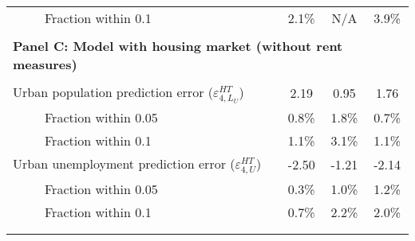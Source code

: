 \begin{tabular}{lrrr}
~~~~~Fraction within 0.1 & \multicolumn{1}{c}{2.1\%} & \multicolumn{1}{c}{N/A} & \multicolumn{1}{c}{3.9\%} \\
      &       &       &  \\
\multicolumn{4}{l}{\textbf{Panel C: Model with housing market (without rent measures)}} \\
      &       &       &  \\
Urban population prediction error ($\varepsilon_{4,L_{U}}^{HT}$) & \multicolumn{1}{c}{2.19} & \multicolumn{1}{c}{0.95} & \multicolumn{1}{c}{1.76} \\
~~~~~Fraction within 0.05 & \multicolumn{1}{c}{0.8\%} & \multicolumn{1}{c}{1.8\%} & \multicolumn{1}{c}{0.7\%} \\
\medskip ~~~~~Fraction within 0.1 & \multicolumn{1}{c}{1.1\%} & \multicolumn{1}{c}{3.1\%} & \multicolumn{1}{c}{1.1\%} \\
Urban unemployment prediction error ($\varepsilon_{4,U}^{HT}$) & \multicolumn{1}{c}{-2.50} & \multicolumn{1}{c}{-1.21} & \multicolumn{1}{c}{-2.14} \\
~~~~~Fraction within 0.05 & \multicolumn{1}{c}{0.3\%} & \multicolumn{1}{c}{1.0\%} & \multicolumn{1}{c}{1.2\%} \\
~~~~~Fraction within 0.1 & \multicolumn{1}{c}{0.7\%} & \multicolumn{1}{c}{2.2\%} & \multicolumn{1}{c}{2.0\%} \\
      &       &       &  \\
\bottomrule &       &       &  \\
\end{tabular}%
